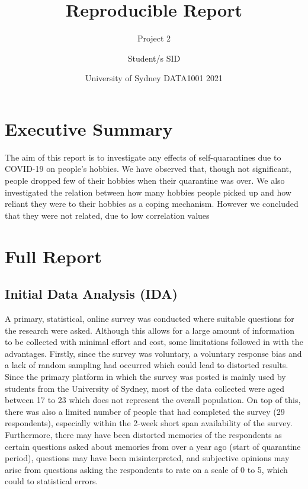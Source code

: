 \documentclass[
]{article}
\title{Reproducible Report}
\subtitle{Project 2}
\author{Student/s SID}
\date{University of Sydney \textbar{} DATA1001 \textbar{} 2021}
\begin{document}
\maketitle

{
\setcounter{tocdepth}{3}
\tableofcontents
}
\hypertarget{executive-summary}{%
\section{Executive Summary}\label{executive-summary}}

The aim of this report is to investigate any effects of self-quarantines
due to COVID-19 on people's hobbies. We have observed that, though not
significant, people dropped few of their hobbies when their quarantine
was over. We also investigated the relation between how many hobbies
people picked up and how reliant they were to their hobbies as a coping
mechanism. However we concluded that they were not related, due to low
correlation values

\hypertarget{full-report}{%
\section{Full Report}\label{full-report}}

\hypertarget{initial-data-analysis-ida}{%
\subsection{Initial Data Analysis
(IDA)}\label{initial-data-analysis-ida}}

A primary, statistical, online survey was conducted where suitable
questions for the research were asked. Although this allows for a large
amount of information to be collected with minimal effort and cost, some
limitations followed in with the advantages. Firstly, since the survey
was voluntary, a voluntary response bias and a lack of random sampling
had occurred which could lead to distorted results. Since the primary
platform in which the survey was posted is mainly used by students from
the University of Sydney, most of the data collected were aged between
17 to 23 which does not represent the overall population. On top of
this, there was also a limited number of people that had completed the
survey (29 respondents), especially within the 2-week short span
availability of the survey. Furthermore, there may have been distorted
memories of the respondents as certain questions asked about memories
from over a year ago (start of quarantine period), questions may have
been misinterpreted, and subjective opinions may arise from questions
asking the respondents to rate on a scale of 0 to 5, which could to
statistical errors.
\end{document}
